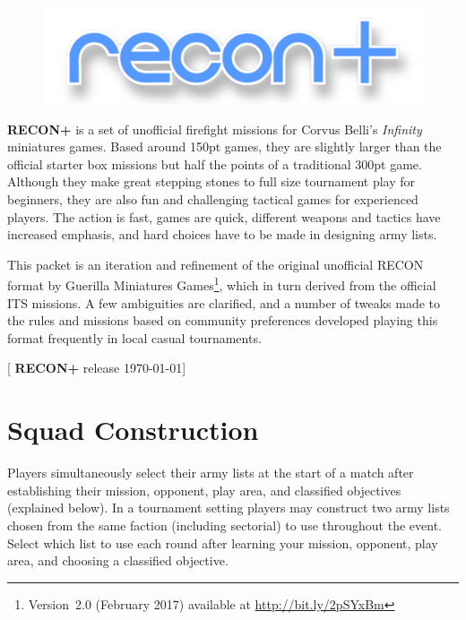 \documentclass[14pt,dvipsnames]{extarticle}
\newcommand{\reconplus}{\textbf{RECON+}\xspace}
\newcommand\BackgroundPic[1]{%
\put(0,0){%
\parbox[b][\paperheight]{\paperwidth}{%
\vfill%
\centering%
\texttt{[image: \#1]}%
\vfill%
}}}
\newcommand{\setbackground}{%
\AddToShipoutPicture{\BackgroundPic{art/background/background.pdf}}%
}
\begin{document}
\thispagestyle{empty}


\clearpage


\begin{figure}[t!]
  \centering
  \includegraphics{art/cover/title.pdf}  
\end{figure}

  
\noindent\reconplus is a set of unofficial firefight missions for Corvus Belli's
\emph{Infinity} miniatures games.  Based around 150pt games, they are
slightly larger than the official starter box missions but half the
points of a traditional 300pt game.  Although they make great stepping
stones to full size tournament play for beginners, they are also fun
and challenging tactical games for experienced players. The action is
fast, games are quick, different weapons and tactics have increased
emphasis, and hard choices have to be made in designing army lists.

This packet is an iteration and refinement of the original unofficial
RECON format by Guerilla Miniatures Games\footnote{Version~2.0
  (February 2017) available at \url{http://bit.ly/2pSYxBm}}, which in
turn derived from the official ITS missions.  A few ambiguities are
clarified, and a number of tweaks made to the rules and missions based
on community preferences developed playing this format frequently in
local casual tournaments.

\tableofcontents

\vfill

\hfill{\small[ \reconplus release \today ]}

\clearpage
{}

\section{Squad Construction}

Players simultaneously select their army lists at the start of a match
after establishing their mission, opponent, play area, and classified
objectives (explained below).  In a tournament setting players may
construct two army lists chosen from the same faction (including
sectorial) to use throughout the event.  Select which list to use each
round after learning your mission, opponent, play area, and choosing a
classified objective.
\end{document}
